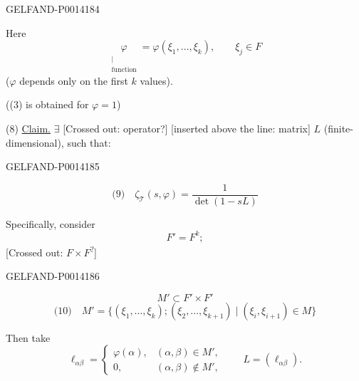 \begin{GelfandAdjacentEvidence}{GELFAND-P001418}{4}


Here
\[
 \underset{\substack{|\\\text{function}}}{\varphi}
 =\varphi(\xi_1,\ldots,\xi_k),\qquad \xi_j\in F
\]
(\(\varphi\) depends only on the first \(k\) values).

((3) is obtained for \(\varphi=1\))

(8) \uline{Claim.} \(\exists\) [Crossed out: operator?]
[inserted above the line: matrix] \(L\) (finite-dimensional), such that:
\end{GelfandAdjacentEvidence}
\begin{GelfandAdjacentEvidence}{GELFAND-P001418}{5}

\[
\text{(9)}\quad \zeta_{\mathcal T}(s,\varphi)=\frac{1}{\det(1-sL)}
\]

Specifically, consider
\[
F'=F^k;
\]
[Crossed out: \(F\times F\)\textsuperscript{?}]
\end{GelfandAdjacentEvidence}
\begin{GelfandAdjacentEvidence}{GELFAND-P001418}{6}

\[
M'\subset F'\times F'
\]
\[
\text{(10)}\quad
M'=\{(\xi_1,\ldots,\xi_k);(\xi_2,\ldots,\xi_{k+1})
 \mid(\xi_i,\xi_{i+1})\in M\}
\]
\end{GelfandAdjacentEvidence}


Then take
\[
 \ell_{\alpha\beta}=
 \begin{cases}
 \varphi(\alpha),&(\alpha,\beta)\in M',\\
 0,&(\alpha,\beta)\notin M',
 \end{cases}
 \qquad L=(\ell_{\alpha\beta}).
\]


